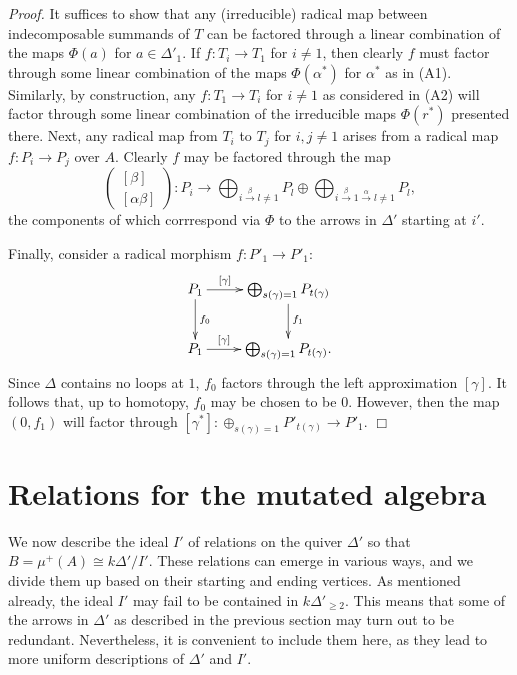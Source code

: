 \documentclass{amsart}
\begin{document}
\noindent
{\it Proof.}  It suffices to show that any (irreducible) radical map between indecomposable summands of $T$ can be factored through a linear combination of the maps $\Phi(a)$ for $a \in \Delta'_1$.  If $f : T_i \rightarrow T_1$ for $i \neq 1$, then clearly $f$ must factor through some linear combination of the maps $\Phi(\alpha^*)$ for $\alpha^*$ as in (A1).  Similarly, by construction, any $f : T_1 \rightarrow T_i$ for $i \neq 1$ as considered in (A2) will factor through some linear combination of the irreducible maps $\Phi(r^*)$ presented there.  Next, any radical map from $T_i$ to $T_j$ for $i, j \neq 1$ arises from a radical map $f : P_i \rightarrow P_j$ over $A$.  Clearly $f$ may be factored through the map 
$$\left( \begin{array}{c} [\beta] \\  \left[\alpha \beta\right] \end{array} \right) : P_i \rightarrow \bigoplus_{i \stackrel{\beta}{\rightarrow} l \neq 1} P_l \oplus \bigoplus_{i \stackrel{\beta}{\rightarrow} 1 \stackrel{\alpha}{\rightarrow} l \neq 1} P_l, $$
the components of which corrrespond via $\Phi$ to the arrows in $\Delta'$ starting at $i'$.

Finally, consider a radical morphism $f : P'_1 \rightarrow P'_1$:
$$\xymatrix{ P_1 \ar[d]^{f_0} \ar[r]^-{[\gamma]} & \bigoplus_{s(\gamma)=1} P_{t(\gamma)} \ar[d]^{f_1} \\ P_1 \ar[r]^-{[\gamma]} & \bigoplus_{s(\gamma)=1} P_{t(\gamma)}.}$$ 
Since $\Delta$ contains no loops at $1$, $f_0$ factors through the left approximation $[\gamma]$.  It follows that, up to homotopy, $f_0$ may be chosen to be $0$.  However, then the map $(0,f_1)$ will factor through $[\gamma^*]: \oplus_{s(\gamma)=1} P'_{t(\gamma)} \rightarrow P'_1$.  $\Box$ \\



\section{Relations for the mutated algebra}

We now describe the ideal $I'$ of relations on the quiver $\Delta'$ so that $B = \mu^+(A) \cong k\Delta'/I'$.  These relations can emerge in various ways, and we divide them up based on their starting and ending vertices.    As mentioned already, the ideal $I'$ may fail to be contained in $k\Delta'_{\geq 2}$.  This means that some of the arrows in $\Delta'$ as described in the previous section may turn out to be redundant.  Nevertheless, it is convenient to include them here, as they lead to more uniform descriptions of $\Delta'$ and $I'$.
\end{document}
